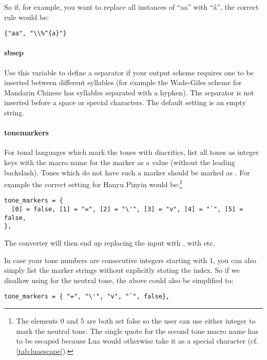 \documentclass{ltxdockit}
\begin{document}
So if, for example, you want to replace all instances of \enquote{aa} with
\enquote{\^{a}}, the correct rule would be:

\begin{lstlisting}
{"aa", "\\%^{a}"}
\end{lstlisting}

\paragraph{sb\textunderscore{}sep}

Use this variable to define a separator if your output scheme requires one to be
inserted between different syllables (for example the Wade-Giles scheme for
Mandarin Chinese has syllables separated with a hyphen). The separator is not
inserted before a space or special characters. The default setting is an empty
string.

\paragraph{tone\textunderscore{}markers}

For tonal languages which mark the tones with diacritics, list all tones as
integer keys with the macro name for the marker as a value (without the
leading backslash). Tones which do not have such a marker should be marked as
. For example the correct setting for Hanyu Pinyin would
be:\footnote{The elements 0 and 5 are both set false so the user can use either
integer to mark the neutral tone. The single quote for the second tone macro
name has to be escaped because Lua would otherwise take it as a special
character (cf. \autoref{tab:luaescape}).}

\begin{lstlisting}
tone_markers = {
  [0] = false, [1] = "=", [2] = "\'", [3] = "v", [4] = "`", [5] = false,
},
\end{lstlisting}

The converter will then end up replacing the input  with
,  with  etc.

In case your tone numbers are consecutive integers starting with 1, you can also
simply list the marker strings without explicitly stating the index. So if we
disallow using  for the neutral tone, the above could also be simplified
to:

\begin{lstlisting}
tone_markers = { "=", "\'", "v", "`", false},
\end{lstlisting}
\end{document}
